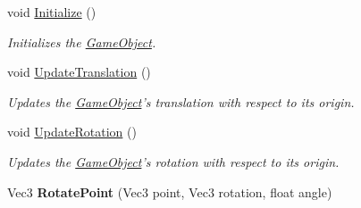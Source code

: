 \begin{DoxyCompactItemize}
\item 
void \hyperlink{classDCEngine_1_1Components_1_1Transform_a1ccd9e077666d50c661aeebedc042843}{Initialize} ()
\begin{DoxyCompactList}\small\item\em Initializes the \hyperlink{classDCEngine_1_1GameObject}{Game\-Object}. \end{DoxyCompactList}\item 
void \hyperlink{classDCEngine_1_1Components_1_1Transform_ad07fdf8b980d59d0aa70314a59e539ad}{Update\-Translation} ()
\begin{DoxyCompactList}\small\item\em Updates the \hyperlink{classDCEngine_1_1GameObject}{Game\-Object}'s translation with respect to its origin. \end{DoxyCompactList}\item 
\hypertarget{classDCEngine_1_1Components_1_1Transform_ae9bb457bcd3b654e7a61acac9483b8ac}{void \hyperlink{classDCEngine_1_1Components_1_1Transform_ae9bb457bcd3b654e7a61acac9483b8ac}{Update\-Rotation} ()}\label{classDCEngine_1_1Components_1_1Transform_ae9bb457bcd3b654e7a61acac9483b8ac}

\begin{DoxyCompactList}\small\item\em Updates the \hyperlink{classDCEngine_1_1GameObject}{Game\-Object}'s rotation with respect to its origin. \end{DoxyCompactList}\item 
\hypertarget{classDCEngine_1_1Components_1_1Transform_a6a6b658d3b6c6e9545b31099b8aa3b8e}{Vec3 {\bfseries Rotate\-Point} (Vec3 point, Vec3 rotation, float angle)}\label{classDCEngine_1_1Components_1_1Transform_a6a6b658d3b6c6e9545b31099b8aa3b8e}

\end{DoxyCompactItemize}
